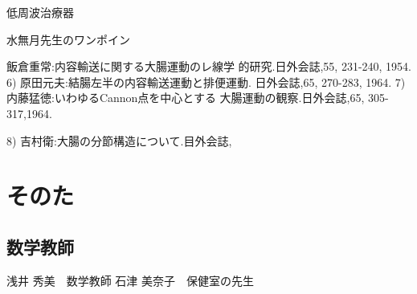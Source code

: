低周波治療器

水無月先生のワンポイン

飯倉重常:内容輸送に関する大腸運動のレ線学
的研究.日外会誌,55, 231-240, 1954.
6) 原田元夫:結腸左半の内容輸送運動と排便運動.
日外会誌,65, 270-283, 1964.
7) 内藤猛徳:いわゆるCannon点を中心とする
大腸運動の観察.日外会誌,65, 305-317,1964.

8) 吉村衛:大腸の分節構造について.目外会誌,




\chapter{そのた}
\section{数学教師}
浅井 秀美　数学教師
石津 美奈子　保健室の先生


